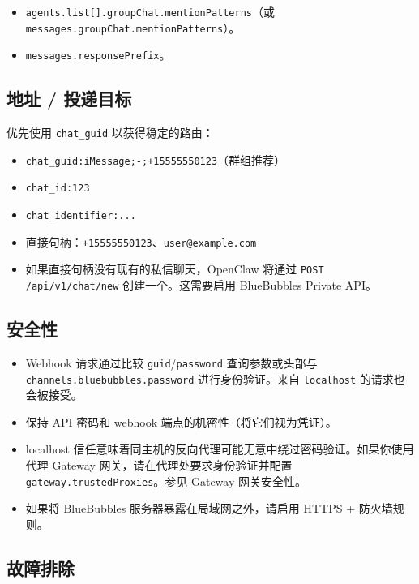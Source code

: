 \begin{itemize}
  \item \texttt{agents.list[].groupChat.mentionPatterns}（或 \texttt{messages.groupChat.mentionPatterns}）。
  \item \texttt{messages.responsePrefix}。
\end{itemize}


\subsection{地址 / 投递目标}


优先使用 \texttt{chat\_guid} 以获得稳定的路由：

\begin{itemize}
  \item \texttt{chat\_guid:iMessage;-;+15555550123}（群组推荐）
  \item \texttt{chat\_id:123}
  \item \texttt{chat\_identifier:...}
  \item 直接句柄：\texttt{+15555550123}、\texttt{user@example.com}
  \item 如果直接句柄没有现有的私信聊天，OpenClaw 将通过 \texttt{POST /api/v1/chat/new} 创建一个。这需要启用 BlueBubbles Private API。
\end{itemize}


\subsection{安全性}


\begin{itemize}
  \item Webhook 请求通过比较 \texttt{guid}/\texttt{password} 查询参数或头部与 \texttt{channels.bluebubbles.password} 进行身份验证。来自 \texttt{localhost} 的请求也会被接受。
  \item 保持 API 密码和 webhook 端点的机密性（将它们视为凭证）。
  \item localhost 信任意味着同主机的反向代理可能无意中绕过密码验证。如果你使用代理 Gateway 网关，请在代理处要求身份验证并配置 \texttt{gateway.trustedProxies}。参见 \href{/gateway/security\#reverse-proxy-configuration}{Gateway 网关安全性}。
  \item 如果将 BlueBubbles 服务器暴露在局域网之外，请启用 HTTPS + 防火墙规则。
\end{itemize}


\subsection{故障排除}



